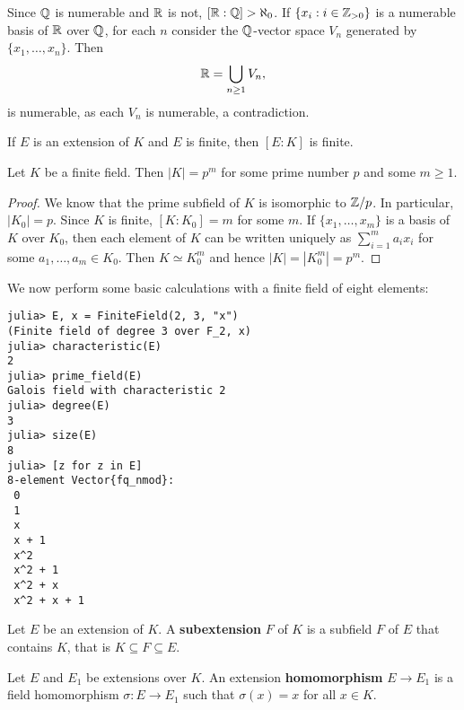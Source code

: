 \begin{example}
	Since $\mathbb{Q}$ is numerable and 
	$\mathbb{R}$ is not, $[\mathbb{R}:\mathbb{Q}]>\aleph_0$. If $\{x_i:i\in\mathbb{Z}_{>0}\}$ 
	is a numerable basis of $\mathbb{R}$ over $\mathbb{Q}$, for each
	$n$ consider the $\mathbb{Q}$-vector space
	$V_n$ generated by $\{x_1,\dots,x_n\}$. Then 
	\[
		\mathbb{R}=\bigcup_{n\geq1}V_n,
	\]
	is numerable, as each $V_n$ is numerable, a contradiction.
\end{example}

If $E$ is an extension of $K$ and $E$ is finite,
then $[E:K]$ is finite. 

\begin{proposition}
	Let $K$ be a finite field. Then $|K|=p^m$ 
	for some prime number $p$ and some $m\geq1$. 
\end{proposition}

\begin{proof}
	We know that the prime subfield of $K$ is isomorphic to $\mathbb{Z}/p$. 
	In particular, $|K_0|=p$. Since $K$ is finite, 
	$[K:K_0]=m$ for some $m$. If $\{x_1,\dots,x_m\}$ is a basis
	of $K$ over $K_0$, then each element
	of $K$ can be written uniquely as
	$\sum_{i=1}^ma_ix_i$ for some $a_1,\dots,a_m\in K_0$. Then
	$K\simeq K_0^m$ and hence $|K|=|K_0^m|=p^m$. 
\end{proof}

We now perform some basic calculations 
with a finite field of eight elements: 
\begin{lstlisting}
julia> E, x = FiniteField(2, 3, "x")
(Finite field of degree 3 over F_2, x)
julia> characteristic(E)
2
julia> prime_field(E)
Galois field with characteristic 2
julia> degree(E)
3
julia> size(E)
8
julia> [z for z in E]
8-element Vector{fq_nmod}:
 0
 1
 x
 x + 1
 x^2
 x^2 + 1
 x^2 + x
 x^2 + x + 1
\end{lstlisting}



\begin{definition}
	Let $E$ be an extension of $K$. A \textbf{subextension} $F$ 
	of $K$ is a subfield $F$ of $E$ that contains $K$, that is
	$K\subseteq F\subseteq E$. 
\end{definition}

\begin{definition}
	Let $E$ and $E_1$ be extensions over $K$. An extension
	\textbf{homomorphism} $E\to E_1$ is a 
	field homomorphism $\sigma\colon E\to E_1$ such that 
	$\sigma(x)=x$ for all $x\in K$. 
\end{definition}

